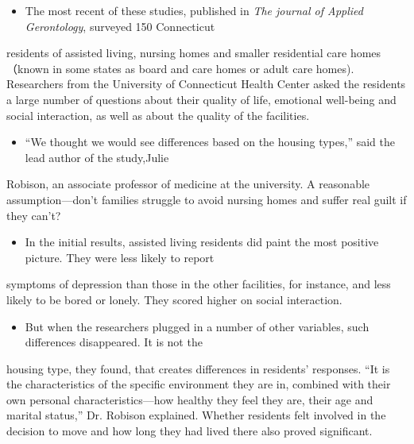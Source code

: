 \documentclass[UTF8,11pt]{ctexart}
\begin{document}
\begin{itemize}[leftmargin=2em,itemsep=.2em,topsep=.4em]\item[D.] The most recent of these studies, published in\textit{ The journal of Applied Gerontology}, surveyed 150 Connecticut
\end{itemize}

residents of assisted living, nursing homes and smaller residential care homes （known in some states as board and care homes or adult care homes). Researchers from the University of Connecticut Health Center asked the residents a large number of questions about their quality of life, emotional well-being and social interaction, as well as about the quality of the facilities.


\begin{itemize}[leftmargin=2em,itemsep=.2em,topsep=.4em]\item[E.] “We thought we would see differences based on the housing types,” said the lead author of the study,Julie
\end{itemize}

Robison, an associate professor of medicine at the university. A reasonable assumption—don't families struggle to avoid nursing homes and suffer real guilt if they can't?


\begin{itemize}[leftmargin=2em,itemsep=.2em,topsep=.4em]\item[F.] In the initial results, assisted living residents did paint the most positive picture. They were less likely to report
\end{itemize}

symptoms of depression than those in the other facilities, for instance, and less likely to be bored or lonely. They scored higher on social interaction.


\begin{itemize}[leftmargin=2em,itemsep=.2em,topsep=.4em]\item[G.] But when the researchers plugged in a number of other variables, such differences disappeared. It is not the
\end{itemize}

housing type, they found, that creates differences in residents' responses. “It is the characteristics of the specific environment they are in, combined with their own personal characteristics—how healthy they feel they are, their age and marital status,” Dr. Robison explained. Whether residents felt involved in the decision to move and how long they had lived there also proved significant.
\end{document}
